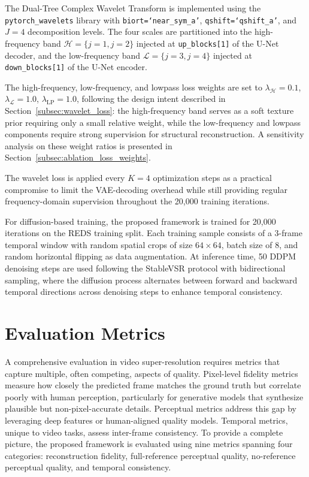 The Dual-Tree Complex Wavelet Transform is implemented using 
the \texttt{pytorch\_wavelets} library 
\cite{cotter2019pytorch} with \texttt{biort=`near\_sym\_a'}, 
\texttt{qshift=`qshift\_a'}, and $J=4$ decomposition levels. 
The four scales are partitioned into the high-frequency band 
$\mathcal{H} = \{j=1, j=2\}$ injected at \texttt{up\_blocks[1]} 
of the U-Net decoder, and the low-frequency band 
$\mathcal{L} = \{j=3, j=4\}$ injected at 
\texttt{down\_blocks[1]} of the U-Net encoder.

The high-frequency, low-frequency, and lowpass loss weights 
are set to $\lambda_{\mathcal{H}} = 0.1$, 
$\lambda_{\mathcal{L}} = 1.0$, $\lambda_{\mathrm{LP}} = 1.0$, 
following the design intent described in 
Section~\ref{subsec:wavelet_loss}: the high-frequency band 
serves as a soft texture prior requiring only a small relative 
weight, while the low-frequency and lowpass components require 
strong supervision for structural reconstruction. A 
sensitivity analysis on these weight ratios is presented in 
Section~\ref{subsec:ablation_loss_weights}.

The wavelet loss is applied every $K=4$ optimization steps as 
a practical compromise to limit the VAE-decoding overhead 
while still providing regular frequency-domain supervision 
throughout the 20{,}000 training iterations.

For diffusion-based training, the proposed framework is 
trained for 20{,}000 iterations on the REDS training split. 
Each training sample consists of a 3-frame temporal window 
with random spatial crops of size $64 \times 64$, batch size 
of 8, and random horizontal flipping as data augmentation. 
At inference time, 50 DDPM denoising steps are used following 
the StableVSR protocol with bidirectional sampling, where the 
diffusion process alternates between forward and backward 
temporal directions across denoising steps to enhance temporal 
consistency.


\section{Evaluation Metrics}
\label{sec:metrics}

A comprehensive evaluation in video super-resolution requires 
metrics that capture multiple, often competing, aspects of 
quality. Pixel-level fidelity metrics measure how closely the 
predicted frame matches the ground truth but correlate poorly 
with human perception, particularly for generative models that 
synthesize plausible but non-pixel-accurate details. Perceptual 
metrics address this gap by leveraging deep features or 
human-aligned quality models. Temporal metrics, unique to 
video tasks, assess inter-frame consistency. To provide a 
complete picture, the proposed framework is evaluated using 
nine metrics spanning four categories: reconstruction fidelity, 
full-reference perceptual quality, no-reference perceptual 
quality, and temporal consistency.



